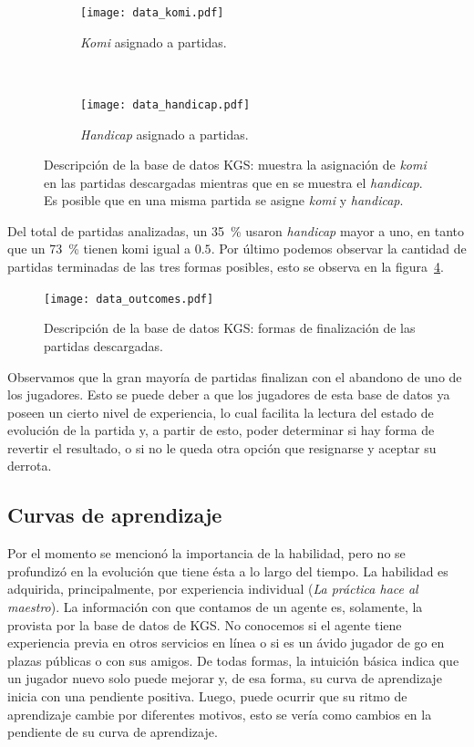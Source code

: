 \documentclass[11pt,twoside,spanish]{report} %
\begin{document}
\begin{figure}[H]
	\centering
	\begin{subfigure}[t]{.49\textwidth}
		\centering
		\texttt{[image: data\_komi.pdf]}
		\caption{\emph{Komi} asignado a partidas.}
		\label{fig:komi}
	\end{subfigure}
	~
	\begin{subfigure}[t]{.49\textwidth}
		\centering
		\texttt{[image: data\_handicap.pdf]}
		\caption{\emph{Handicap} asignado a partidas.}
		\label{fig:handicap}
	\end{subfigure}
	\caption{Descripci\'on de la base de datos KGS: muestra la asignaci\'on de \emph{komi} en las partidas descargadas mientras que en  se muestra el \emph{handicap}. Es posible que en una misma partida se asigne \emph{komi} y \emph{handicap}.}
	\label{fig:komiHandicap}
\end{figure}


Del total de partidas analizadas, un \SI{35}{\percent} usaron \textit{handicap} mayor a uno, en tanto que un \SI{73}{\percent}  tienen komi igual a $0.5$.
Por \'ultimo podemos observar la cantidad de partidas terminadas de las tres formas posibles, esto se observa en la figura~\ref{fig:Outcomes}.

\begin{figure}[H]
	\centering
	\texttt{[image: data\_outcomes.pdf]}
	\caption{Descripci\'on de la base de datos KGS: formas de finalizaci\'on de las partidas descargadas.}
	\label{fig:Outcomes}
\end{figure}

Observamos que la gran mayor\'ia de partidas finalizan con el abandono de uno de los jugadores.
Esto se puede deber a que los jugadores de esta base de datos ya poseen un cierto nivel de experiencia, lo cual facilita la lectura del estado de evoluci\'on de la partida y, a partir de esto, poder determinar si hay forma de revertir el resultado, o si no le queda otra opci\'on que resignarse y aceptar su derrota.

\subsection{Curvas de aprendizaje}

Por el momento se mencion\'o la importancia de la habilidad, pero no se profundiz\'o en la evoluci\'on que tiene \'esta a lo largo del tiempo.
La habilidad es adquirida, principalmente, por experiencia individual (\textsl{La pr\'actica hace al maestro}).
La informaci\'on con que contamos de un agente es, solamente, la provista por la base de datos de KGS.
No conocemos si el agente tiene experiencia previa en otros servicios en l\'inea o si es un \'avido jugador de go en plazas p\'ublicas o con sus amigos.
De todas formas, la intuici\'on b\'asica indica que un jugador nuevo solo puede mejorar y, de esa forma, su curva de aprendizaje inicia con una pendiente positiva.
Luego, puede ocurrir que su ritmo de aprendizaje cambie por diferentes motivos, esto se ver\'ia como cambios en la pendiente de su curva de aprendizaje.
\end{document}
